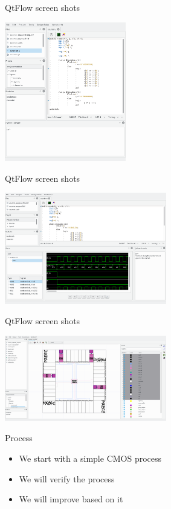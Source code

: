 \documentclass[9pt]{beamer}
\begin{document}
\begin{frame}{QtFlow screen shots}
	\begin{center}
		\includegraphics[width=150pt]{Screenshot_20171218_044022.png}
	\end{center}
\end{frame}
\begin{frame}{QtFlow screen shots}
	\begin{center}
		\includegraphics[width=200pt]{Screenshot_20171218_045118.png}
	\end{center}
\end{frame}
\begin{frame}{QtFlow screen shots}
	\begin{center}
		\includegraphics[width=200pt]{Screenshot_20171218_045416.png}
	\end{center}
\end{frame}

\begin{frame}{Process}
	\begin{itemize}
		\item We start with a simple CMOS process\footnotemark
		\item We will verify the process
		\item We will improve based on it
	\end{itemize}
	
\end{frame}
\end{document}
